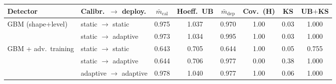 \begin{tabular}{llcccccc}
\toprule
Detector & Calibr.\ $\to$ deploy. & $\bar m_{\mathrm{cal}}$ & Hoeff.\ UB & $\bar m_{\mathrm{dep}}$ & Cov.\ (H) & KS & UB$+$KS \\
\midrule
GBM (shape+level) & static $\to$ static & 0.975 & 1.037 & 0.970 & 1.00 & 0.03 & 1.000 \\
 & static $\to$ adaptive & 0.973 & 1.034 & 0.995 & 1.00 & 0.03 & 1.000 \\
\midrule
GBM + adv.\ training & static $\to$ static & 0.643 & 0.705 & 0.644 & 1.00 & 0.05 & 0.755 \\
 & static $\to$ adaptive & 0.644 & 0.706 & 0.977 & 0.00 & 0.38 & 1.000 \\
 & adaptive $\to$ adaptive & 0.978 & 1.040 & 0.977 & 1.00 & 0.06 & 1.000 \\
\bottomrule
\end{tabular}
